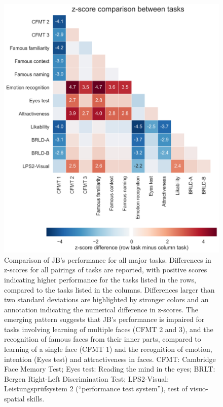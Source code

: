\documentclass[fleqn,10pt]{SelfArx} %
\begin{document}
\begin{figure}[htbp]
	
	\renewcommand{\familydefault}{\sfdefault}\normalfont
	\centering
	\includegraphics[width=\columnwidth]{../reports/figures/overview_heatmap_mod.png}
	\vspace*{-3mm}
 		\caption{Comparison of JB's performance for all major tasks. Differences in z-scores for all pairings of tasks are reported, with positive scores indicating higher performance for the tasks listed in the rows, compared to the tasks listed in the columns. Differences larger than two standard deviations are highlighted by stronger colors and an annotation indicating the numerical difference in z-scores. The emerging pattern suggests that JB’s performance is impaired for tasks involving learning of multiple faces (CFMT 2 and 3), and the recognition of famous faces from their inner parts, compared to learning of a single face (CFMT 1) and the recognition of emotion, intention (Eyes test) and attractiveness in faces. CFMT: Cambridge Face Memory Test; Eyes test: Reading the mind in the eyes; BRLT: Bergen Right-Left Discrimination Test; LPS2-Visual: Leistungsprüfsystem 2 (“performance test system”), test of visuo-spatial skills.}%
 		\label{fig:heat}
	
\end{figure}
\end{document}
